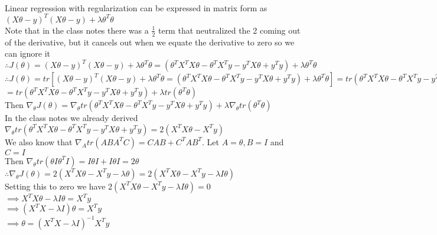 \begin{answer}\\
Linear regression with regularization can be expressed in matrix form as \\
$(X\theta-y)^T (X\theta-y)+\lambda \theta^T \theta$\\
Note that in the class notes there was a $\frac{1}{2}$ term that neutralized the 2 coming out of the derivative, but it cancels out when we equate the derivative to zero so we can ignore it\\
$\therefore J(\theta)=(X\theta-y)^T (X\theta-y)+\lambda \theta^T \theta=(\theta^TX^TX \theta-\theta^TX^Ty -y^TX\theta+y^Ty) + \lambda \theta^T \theta$\\
$\therefore J(\theta)=tr \left [(X\theta-y)^T (X\theta-y)+\lambda \theta^T \theta=(\theta^TX^TX \theta-\theta^TX^Ty -y^TX\theta+y^Ty) + \lambda \theta^T \theta \right ]=tr(\theta^TX^TX \theta-\theta^TX^Ty -y^TX\theta+y^Ty) + tr(\lambda \theta^T \theta)$\\
$=tr(\theta^TX^TX \theta-\theta^TX^Ty -y^TX\theta+y^Ty) + \lambda tr(\theta^T \theta)$\\
Then $\nabla_{\theta}J(\theta)=\nabla_{\theta}tr(\theta^TX^TX \theta-\theta^TX^Ty -y^TX\theta+y^Ty)+\lambda \nabla_{\theta} tr(\theta^T \theta)$\\
In the class notes we already derived $\nabla_{\theta}tr(\theta^TX^TX \theta-\theta^TX^Ty -y^TX\theta+y^Ty) = 2(X^TX\theta - X^Ty)$\\
We also know that $\nabla_{A} tr(ABA^TC)=CAB+C^TAB^T$. Let $A=\theta, B=I$ and $C=I$\\
Then $\nabla_{\theta}tr(\theta I \theta^T I)=I \theta I+ I \theta I = 2 \theta$\\
$\therefore \nabla_{\theta}J(\theta)=2(X^TX\theta - X^Ty - \lambda \theta)=2(X^TX\theta - X^Ty - \lambda I \theta)$\\
Setting this to zero we have
$2(X^TX\theta - X^Ty - \lambda I \theta)=0$\\
$\implies X^TX\theta  - \lambda I \theta= X^Ty$\\
$\implies (X^TX-\lambda I) \theta=X^Ty$\\
$\implies \theta=(X^TX-\lambda I)^{-1}X^Ty$\\
\end{answer}
